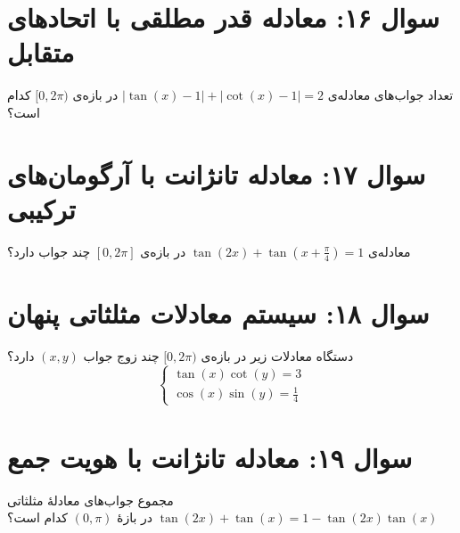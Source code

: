 \documentclass[12pt]{article}
\begin{document}
	
	\vspace{1cm}
	\hrulefill
	\vspace{1cm}
	\section*{سوال ۱۶: معادله قدر مطلقی با اتحادهای متقابل}
	تعداد جواب‌های معادله‌ی \( |\tan(x) - 1| + |\cot(x) - 1| = 2 \) در بازه‌ی \( [0, 2\pi) \) کدام است؟
	
	
	\vspace{1cm}
	\hrulefill
	\vspace{1cm}
	\section*{سوال ۱۷: معادله تانژانت با آرگومان‌های ترکیبی}
	معادله‌ی \( \tan(2x) + \tan(x + \frac{\pi}{4}) = 1 \) در بازه‌ی \( [0, 2\pi] \) چند جواب دارد؟
	
	
	\vspace{1cm}
	\hrulefill
	\vspace{1cm}
	\section*{سوال ۱۸: سیستم معادلات مثلثاتی پنهان}
	دستگاه معادلات زیر در بازه‌ی \( [0, 2\pi) \) چند زوج جواب \( (x, y) \) دارد؟
	\[ \begin{cases} \tan(x)\cot(y) = 3 \\ \cos(x)\sin(y) = \frac{1}{4} \end{cases} \]
	
	
	\vspace{1cm}
	\hrulefill
	\vspace{1cm}
	\section*{سوال ۱۹: معادله تانژانت با هویت جمع}
	مجموع جواب‌های معادلهٔ مثلثاتی \( \tan(2x) + \tan(x) = 1 - \tan(2x)\tan(x) \) در بازهٔ \( (0, \pi) \) کدام است؟
	
\end{document}

